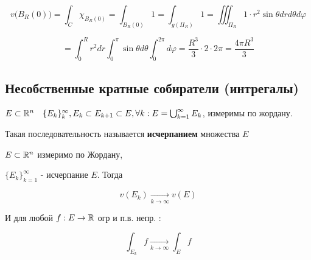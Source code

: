     $$v\big(B_R(0)\big) = \int_C \chi_{B_R(0)} = \int_{B_R(0)} 1 = \int_{g(\Pi_R)} 1 = \iiint_{\Pi_R}1 \cdot r^2 \sin\theta drd\theta d\varphi$$

    $$=\int^R_0 r^2dr\int^\pi_0 \sin\theta d\theta \int^{2\pi}_0 d\varphi = \frac{R^3}{3} \cdot 2 \cdot 2\pi = \frac{4\pi R^3}{3}$$

    \subsection*{Несобственные кратные собиратели (интрегалы)}  %

    \begin{definition}
        $E \subset \mathbb{R}^n \quad \{ E_k\}_k^{\infty}, E_k \subset E_{k+1} \subset E, \forall k: E = \bigcup^\infty_{k=1} E_k$, измеримы по жордану.

        Такая последовательность называется \textbf{исчерпанием} множества $E$

    \end{definition}
    \begin{lemma} %
        $E\subset \mathbb{R}^n$ измеримо по Жордану, %
        
        $\{E_k\}_{k=1}^\infty$ - исчерпание $E$. Тогда

        $$v(E_k) \underset{k\to\infty}{\to} v(E)$$

        И для любой $f: E \to \mathbb{R}$ огр и п.в. непр. :

        $$\int_{E_k} f \underset{k\to\infty}{\to} \int_E f$$
        
    \end{lemma}
